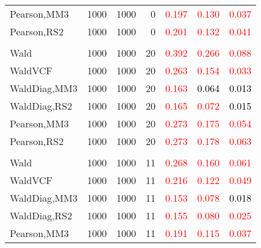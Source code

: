 \documentclass[
]{article}
\begin{document}
\begin{table}[H]
{\begin{tabular}[t]{lrrrrrr}
\hspace{1em}Pearson,MM3 & 1000 & 1000 & 0 & \textcolor{red}{0.197} & \textcolor{red}{0.130} & \textcolor{red}{0.037}\\
\hspace{1em}Pearson,RS2 & 1000 & 1000 & 0 & \textcolor{red}{0.201} & \textcolor{red}{0.132} & \textcolor{red}{0.041}\\
\addlinespace[0.3em]
\multicolumn{7}{l}{\textbf{1F 15V}}\\
\hspace{1em}Wald & 1000 & 1000 & 20 & \textcolor{red}{0.392} & \textcolor{red}{0.266} & \textcolor{red}{0.088}\\
\hspace{1em}WaldVCF & 1000 & 1000 & 20 & \textcolor{red}{0.263} & \textcolor{red}{0.154} & \textcolor{red}{0.033}\\
\hspace{1em}WaldDiag,MM3 & 1000 & 1000 & 20 & \textcolor{red}{0.163} & \textcolor{black}{0.064} & \textcolor{black}{0.013}\\
\hspace{1em}WaldDiag,RS2 & 1000 & 1000 & 20 & \textcolor{red}{0.165} & \textcolor{red}{0.072} & \textcolor{black}{0.015}\\
\hspace{1em}Pearson,MM3 & 1000 & 1000 & 20 & \textcolor{red}{0.273} & \textcolor{red}{0.175} & \textcolor{red}{0.054}\\
\hspace{1em}Pearson,RS2 & 1000 & 1000 & 20 & \textcolor{red}{0.273} & \textcolor{red}{0.178} & \textcolor{red}{0.063}\\
\addlinespace[0.3em]
\multicolumn{7}{l}{\textbf{2F 10V}}\\
\hspace{1em}Wald & 1000 & 1000 & 11 & \textcolor{red}{0.268} & \textcolor{red}{0.160} & \textcolor{red}{0.061}\\
\hspace{1em}WaldVCF & 1000 & 1000 & 11 & \textcolor{red}{0.216} & \textcolor{red}{0.122} & \textcolor{red}{0.049}\\
\hspace{1em}WaldDiag,MM3 & 1000 & 1000 & 11 & \textcolor{red}{0.153} & \textcolor{red}{0.078} & \textcolor{black}{0.018}\\
\hspace{1em}WaldDiag,RS2 & 1000 & 1000 & 11 & \textcolor{red}{0.155} & \textcolor{red}{0.080} & \textcolor{red}{0.025}\\
\hspace{1em}Pearson,MM3 & 1000 & 1000 & 11 & \textcolor{red}{0.191} & \textcolor{red}{0.115} & \textcolor{red}{0.037}\\

\end{tabular}}
\end{table}
\end{document}
